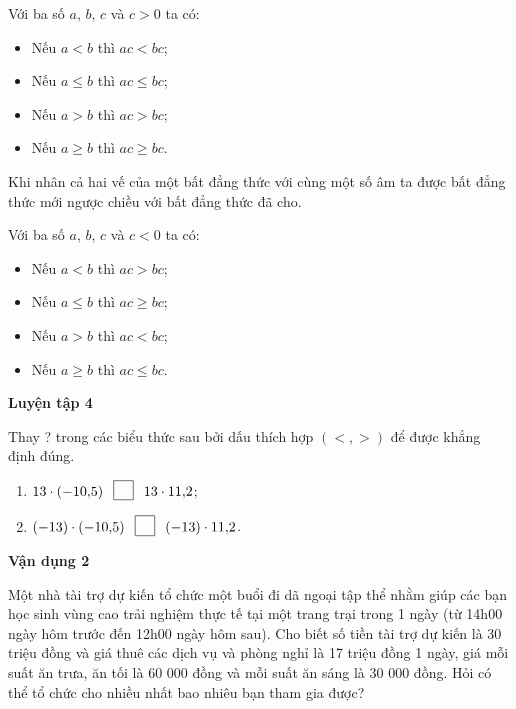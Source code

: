 \begin{lesson}
\begin{keyconcept}
        Với ba số $a$, $b$, $c$ và $c>0$ ta có:
        \begin{itemize}
            \item Nếu $a<b$ thì $ac<bc$;
            \item Nếu $a\le b$ thì $ac\le bc$;
            \item Nếu $a>b$ thì $ac>bc$;
            \item Nếu $a\ge b$ thì $ac\ge bc$.
        \end{itemize}
    \end{keyconcept}

    \begin{keyconcept}
        Khi nhân cả hai vế của một bất đẳng thức với cùng một số âm ta được bất đẳng thức mới ngược chiều với bất đẳng thức đã cho.

        Với ba số $a$, $b$, $c$ và $c<0$ ta có:
        \begin{itemize}
            \item Nếu $a<b$ thì $ac>bc$;
            \item Nếu $a\le b$ thì $ac\ge bc$;
            \item Nếu $a>b$ thì $ac<bc$;
            \item Nếu $a\ge b$ thì $ac\le bc$.
        \end{itemize}
    \end{keyconcept}

    \textbf{Luyện tập 4}

    Thay ? trong các biểu thức sau bởi dấu thích hợp $(<,>)$ để được khẳng định đúng.
    \begin{enumerate}[label=\alph*)]
        \item $13\cdot(-10{,}5)\ \answerbox\ 13\cdot 11{,}2$;
        \item $(-13)\cdot(-10{,}5)\ \answerbox\ (-13)\cdot 11{,}2$.
    \end{enumerate}

    \textbf{Vận dụng 2}

    Một nhà tài trợ dự kiến tổ chức một buổi đi dã ngoại tập thể nhằm giúp các bạn học sinh vùng cao trải nghiệm thực tế tại một trang trại trong 1 ngày (từ 14h00 ngày hôm trước đến 12h00 ngày hôm sau). Cho biết số tiền tài trợ dự kiến là 30 triệu đồng và giá thuê các dịch vụ và phòng nghỉ là 17 triệu đồng 1 ngày, giá mỗi suất ăn trưa, ăn tối là 60 000 đồng và mỗi suất ăn sáng là 30 000 đồng. Hỏi có thể tổ chức cho nhiều nhất bao nhiêu bạn tham gia được?

    \answerline
    \answerline
    \answerline
\end{lesson}

